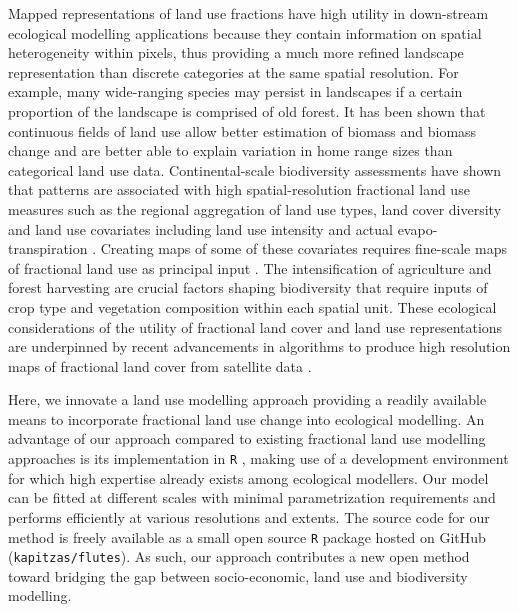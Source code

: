 \documentclass[titlesmallcaps,copyrightpage]{uomthesis}\usepackage[]{graphicx}\usepackage[]{color}
\begin{document}
Mapped representations of land use fractions have high utility in
down-stream ecological modelling applications because they contain
information on spatial heterogeneity within pixels, thus providing a
much more refined landscape representation than discrete categories at
the same spatial resolution. For example, many wide-ranging species may
persist in landscapes if a certain proportion of the landscape is
comprised of old forest. It has been shown that continuous fields of
land use allow better estimation of biomass and biomass change
\citep{xian_characterization_2015} and are better able to explain
variation in home range sizes \citep{bevanda_adding_2014} than
categorical land use data. Continental-scale biodiversity assessments
have shown that patterns are associated with high spatial-resolution
fractional land use measures such as the regional aggregation of land
use types, land cover diversity and land use covariates including land
use intensity \citep{mouchet_testing_2015} and actual
evapo-transpiration \citep{mouchet_testing_2015, whittaker_geographical_2006}. Creating maps
of some of these covariates requires fine-scale maps of fractional land use as principal input \citep{plutzar_changes_2016}. The intensification of agriculture and forest harvesting are crucial factors shaping biodiversity \citep{levers_drivers_2014, levers_drivers_2016} that
require inputs of crop type and vegetation composition within each
spatial unit. These ecological considerations of the utility of
fractional land cover and land use representations are underpinned by
recent advancements in algorithms to produce high resolution maps of
fractional land cover from satellite data
\citep{allred_improving_2021, hill_modis_2020}.

Here, we innovate a land use modelling approach providing a readily
available means to incorporate fractional land use change into
ecological modelling. An advantage of our approach compared to existing
fractional land use modelling approaches is its implementation in \texttt{R} \citep{r_development_core_team_r_2008}, making use of a development
environment for which high expertise already exists among ecological
modellers. Our model can be fitted at different scales with minimal
parametrization requirements and performs efficiently at various
resolutions and extents. The source code for our method is freely
available as a small open source \texttt{R} package hosted on GitHub
(\texttt{kapitzas/flutes}). As such, our approach contributes a new open method
toward bridging the gap between socio-economic, land use and
biodiversity modelling.
\end{document}

